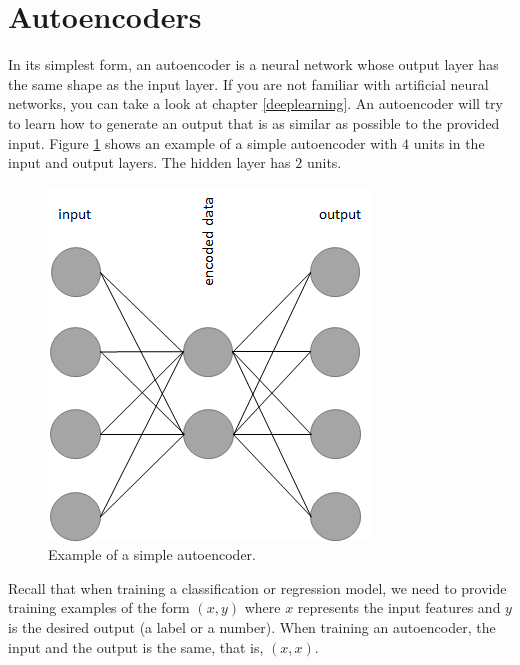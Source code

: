 \documentclass[
  11pt,
]{krantz}
\begin{document}
\hypertarget{autoencoders}{%
\section{Autoencoders}\label{autoencoders}}

In its simplest form, an autoencoder is a neural network whose output layer has the same shape as the input layer. If you are not familiar with artificial neural networks, you can take a look at chapter \ref{deeplearning}. An autoencoder will try to learn how to generate an output that is as similar as possible to the provided input. Figure \ref{fig:simpleAutoencoder} shows an example of a simple autoencoder with \(4\) units in the input and output layers. The hidden layer has \(2\) units.

\begin{figure}

{\centering \includegraphics[width=0.4\linewidth]{images/autoencoder} 

}

\caption{Example of a simple autoencoder.}\label{fig:simpleAutoencoder}
\end{figure}

Recall that when training a classification or regression model, we need to provide training examples of the form \((x,y)\) where \(x\) represents the input features and \(y\) is the desired output (a label or a number). When training an autoencoder, the input and the output is the same, that is, \((x,x)\).
\end{document}
